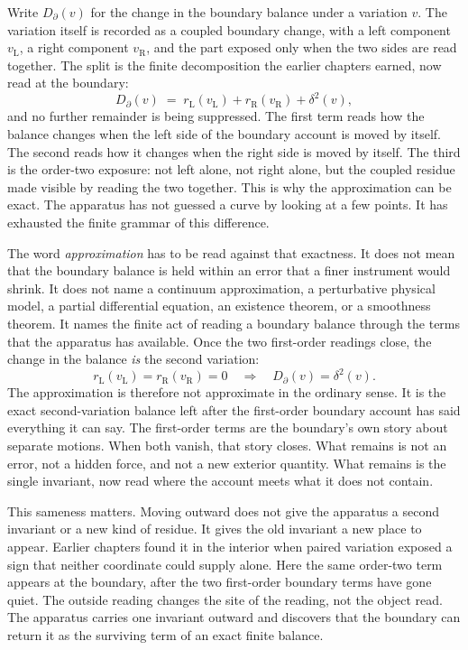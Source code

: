 Write \(D_{\partial}(v)\) for the change in the boundary balance under a variation \(v\). The
variation itself is recorded as a coupled boundary change, with a left component
\(v_{\mathrm{L}}\), a right component \(v_{\mathrm{R}}\), and the part exposed only when the two
sides are read together. The split is the finite decomposition the earlier chapters earned, now
read at the boundary:
\[
  D_{\partial}(v)
    \;=\;
  r_{\mathrm{L}}(v_{\mathrm{L}})
  + r_{\mathrm{R}}(v_{\mathrm{R}})
  + \delta^{2}(v),
\]
and no further remainder is being suppressed. The first term reads how the balance changes when
the left side of the boundary account is moved by itself. The second reads how it changes when
the right side is moved by itself. The third is the order-two exposure: not left alone, not right
alone, but the coupled residue made visible by reading the two together. This is why the
approximation can be exact. The apparatus has not guessed a curve by looking at a few points. It
has exhausted the finite grammar of this difference.

The word \emph{approximation} has to be read against that exactness. It does not mean that the
boundary balance is held within an error that a finer instrument would shrink. It does not name a
continuum approximation, a perturbative physical model, a partial differential equation, an
existence theorem, or a smoothness theorem. It names the finite act of reading a boundary balance
through the terms that the apparatus has available. Once the two first-order readings close, the
change in the balance \emph{is} the second variation:
\[
  r_{\mathrm{L}}(v_{\mathrm{L}}) = r_{\mathrm{R}}(v_{\mathrm{R}}) = 0
  \quad\Longrightarrow\quad
  D_{\partial}(v) = \delta^{2}(v).
\]
The approximation is therefore not approximate in the ordinary sense. It is the exact
second-variation balance left after the first-order boundary account has said everything it can
say. The first-order terms are the boundary's own story about separate motions. When both vanish,
that story closes. What remains is not an error, not a hidden force, and not a new exterior
quantity. What remains is the single invariant, now read where the account meets what it does not
contain.

This sameness matters. Moving outward does not give the apparatus a second invariant or a new
kind of residue. It gives the old invariant a new place to appear. Earlier chapters found it in
the interior when paired variation exposed a sign that neither coordinate could supply alone.
Here the same order-two term appears at the boundary, after the two first-order boundary terms
have gone quiet. The outside reading changes the site of the reading, not the object read. The
apparatus carries one invariant outward and discovers that the boundary can return it as the
surviving term of an exact finite balance.

